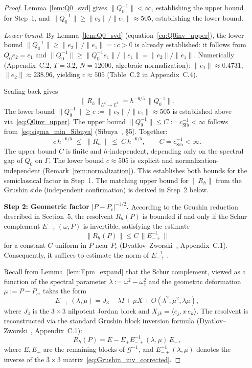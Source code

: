 \documentclass[12pt,a4paper]{amsart}
\theoremstyle{remark}
\begin{document}
\begin{proof}
Lemma~\ref{lem:Q0_svd} gives $\|Q_0^{-1}\| < \infty$, establishing the
upper bound for Step~1, and $\|Q_0^{-1}\| \geq \|e_2\|/\|e_1\| \approx 505$,
establishing the lower bound.

\emph{Lower bound.}
By Lemma~\ref{lem:Q0_svd} (equation~\eqref{eq:Q0inv_upper}), the lower bound
$\|Q_0^{-1}\| \geq \|e_2\|/\|e_1\| =: c > 0$
is already established: it follows from $Q_0 e_2 = e_1$ and
$\|Q_0^{-1}\| \geq \|Q_0^{-1} e_1\|/\|e_1\| = \|e_2\|/\|e_1\|$.
Numerically (Appendix~C.2, $T=3.2$, $N=12000$, algebraic normalization):
$\|e_1\| \approx 0.4731$, $\|e_2\| \approx 238.96$,
yielding $c \approx 505$ (Table~C.2 in Appendix~C.4).

Scaling back gives
\[
  \|R_h\|_{L^2\to L^2} = h^{-6/5}\,\|Q_0^{-1}\|.
\]
The lower bound $\|Q_0^{-1}\| \geq c := \|e_2\|/\|e_1\| \approx 505$
is established above via~\eqref{eq:Q0inv_upper}.
The upper bound $\|Q_0^{-1}\| \leq C := c_{\mathrm{Sib}}^{-1} < \infty$
follows from~\eqref{eq:sigma_min_Sibuya} (Sibuya~\cite{Sibuya75}, \S5).
Together:
\[
  c\,h^{-6/5} \;\leq\; \|R_h\| \;\leq\; C\,h^{-6/5},
  \qquad C = c_{\mathrm{Sib}}^{-1} < \infty.
\]
The upper bound $C$ is finite and $h$-independent, depending only on
the spectral gap of $Q_0$ on $\Gamma$.
The lower bound $c \approx 505$ is explicit and normalization-independent
(Remark~\ref{rem:normalization}).
This establishes both bounds for the semiclassical factor in Step~1.
The matching upper bound for $\|R_h\|$ from the Grushin side
(independent confirmation) is derived in Step~2 below.

\textbf{Step 2: Geometric factor $|P-P_c|^{-1/2}$.}
According to the Grushin reduction described in Section~5, the resolvent $R_h(P)$
is bounded if and only if the Schur complement $E_{-+}(\omega,P)$ is invertible, satisfying the estimate
\[
  \|R_h(P)\| \leq C\,\|E_{-+}^{-1}\|
\]
for a constant $C$ uniform in $P$ near $P_c$
(Dyatlov--Zworski~\cite{DZ19}, Appendix~C.1).
Consequently, it suffices to estimate the norm of $E_{-+}^{-1}$.

Recall from Lemma~\ref{lem:Epm_expand} that the Schur complement, viewed as a function
of the spectral parameter $\lambda := \omega^2 - \omega_c^2$ and the geometric
deformation $\mu := P - P_c$, takes the form
\begin{equation}\label{eq:Grushin_inv_corrected}
  E_{-+}(\lambda,\mu) = J_3 - \lambda I + \mu X + O(\lambda^2,\mu^2,\lambda\mu),
\end{equation}
where $J_3$ is the $3\times 3$ nilpotent Jordan block and $X_{jk} = \langle e_j, x\,e_k\rangle$.
The resolvent is reconstructed via the standard Grushin block inversion formula
(Dyatlov--Zworski~\cite{DZ19}, Appendix~C.1):
\[
  R_h(P) = E - E_+ E_{-+}^{-1}(\lambda,\mu)\, E_-,
\]
where $E, E_\pm$ are the remaining blocks of $\mathcal{G}^{-1}$, and
$E_{-+}^{-1}(\lambda,\mu)$ denotes the inverse of the
$3\times 3$ matrix~\eqref{eq:Grushin_inv_corrected}.


\end{proof}
\end{document}
